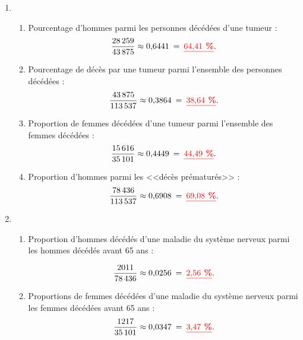 \documentclass[12pt,a4paper]{article}
\begin{document}
\begin{enumerate}[label=\arabic*.]
	\item \begin{enumerate}[label=\alph*)]
		\item Pourcentage d'hommes parmi les personnes décédées d'une tumeur :
		\begin{equation*}
			\dfrac{\num{28259}}{\num{43875}} \approx \num{0.6441} \: = \: \textcolor{red}{\underline{\textbf{\num{64.41} \%}}}.
		\end{equation*} 
		
		\item Pourcentage de décès par une tumeur parmi l'ensemble des personnes décédées :
		\begin{equation*}
			\dfrac{\num{43875}}{\num{113537}} \approx \num{0.3864}\: = \: \textcolor{red}{\underline{\textbf{\num{38.64} \%}}}.
		\end{equation*}
		
		\item Proportion de femmes décédées d'une tumeur parmi l'ensemble des femmes décédées :
		\begin{equation*}
			\dfrac{\num{15616}}{\num{35101}} \approx \num{0.4449} \: = \: \textcolor{red}{\underline{\textbf{\num{44.49} \%}}}.
		\end{equation*}
		
		\item Proportion d'hommes parmi les <<décès prématurés>> :
		\begin{equation*}
			\dfrac{\num{78436}}{\num{113537}} \approx \num{0.6908} \: = \: \textcolor{red}{\underline{\textbf{\num{69.08} \%}}}.
		\end{equation*}
	\end{enumerate}

	\item \begin{enumerate}[label=\alph*)]
		\item Proportion d'hommes décédés  d'une maladie du système nerveux parmi les hommes décédés avant 65 ans :
		
		\begin{equation*}
			\dfrac{\num{2011}}{\num{78436}} \approx \num{0.0256} \: = \: \textcolor{red}{\underline{\textbf{\num{2.56} \%}}}.
		\end{equation*}
		
		\item Proportions de femmes décédées d'une maladie du système nerveux parmi les femmes décédées avant 65 ans :
		\begin{equation*}
			\dfrac{\num{1217}}{\num{35101}} \approx \num{0.0347} 	\: = \:  \textcolor{red}{\underline{\textbf{\num{3.47} \%}}}.
		\end{equation*}
		

\end{enumerate}
\end{enumerate}
\end{document}
